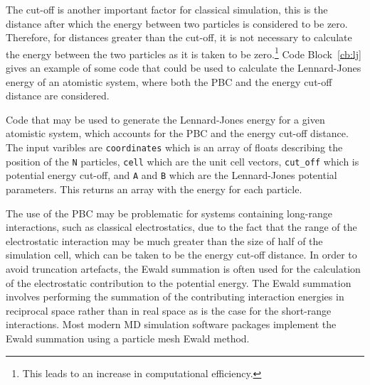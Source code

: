 The cut-off is another important factor for classical simulation, this is the distance after which the energy between two particles is considered to be zero.
Therefore, for distances greater than the cut-off, it is not necessary to calculate the energy between the two particles as it is taken to be zero.\footnote{This leads to an increase in computational efficiency.}
Code Block~\ref{cb:lj} gives an example of some code that could be used to calculate the Lennard-Jones energy of an atomistic system, where both the PBC and the energy cut-off distance are considered.
%
\begin{listing}[b]
    \forcerectofloat
    \centering
    \caption{Code that may be used to generate the Lennard-Jones energy for a given atomistic system, which accounts for the PBC and the energy cut-off distance. The input varibles are \texttt{coordinates} which is an array of floats describing the position of the \texttt{N} particles, \texttt{cell} which are the unit cell vectors, \texttt{cut\_off} which is potential energy cut-off, and \texttt{A} and \texttt{B} which are the Lennard-Jones potential parameters. This returns an array with the energy for each particle.}
    
    \label{cb:lj}
\end{listing}
%

The use of the PBC may be problematic for systems containing long-range interactions, such as classical electrostatics, due to the fact that the range of the electrostatic interaction may be much greater than the size of half of the simulation cell, which can be taken to be the energy cut-off distance.
In order to avoid truncation artefacts, the Ewald summation is often used for the calculation of the electrostatic contribution to the potential energy.
The Ewald summation involves performing the summation of the contributing interaction energies in reciprocal space rather than in real space as is the case for the short-range interactions.
Most modern MD simulation software packages implement the Ewald summation using a particle mesh Ewald method.

